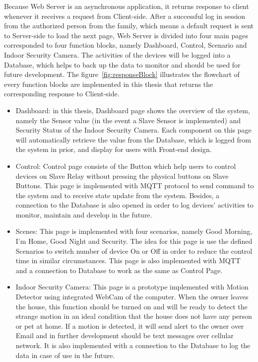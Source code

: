         Because Web Server is an asynchronous application, it returns response to client whenever it receives a request from Client-side. After a successful log in session from the authorized person from the family, which means a default request is sent to Server-side to load the next page, Web Server is divided into four main pages corresponded to four function blocks, namely Dashboard, Control, Scenario and Indoor Security Camera. The activities of the devices will be logged into a Database, which helps to back up the data to monitor and should be used for future development. The figure~\ref{fig:responseBlock} illustrates the flowchart of every function blocks are implemented in this thesis that returns the corresponding response to Client-side.
        \begin{itemize}
            \item Dashboard: in this thesis, Dashboard page shows the overview of the system, namely the Sensor value (in the event a Slave Sensor is implemented) and Security Status of the Indoor Security Camera. Each component on this page will automatically retrieve the value from the Database, which is logged from the system in prior, and display for users with Front-end design.
            \item Control: Control page consists of the Button which help users to control devices on Slave Relay without pressing the physical buttons on Slave Buttons. This page is implemented with MQTT protocol to send command to the system and to receive state update from the system. Besides, a connection to the Database is also opened in order to log devices’ activities to monitor, maintain and develop in the future.
            \item Scenes: This page is implemented with four scenarios, namely Good Morning, I’m Home, Good Night and Security. The idea for this page is use the defined Scenarios to switch number of device On or Off in order to reduce the control time in similar circumstances. This page is also implemented with MQTT and a connection to Database to work as the same as Control Page.
            \item Indoor Security Camera: This page is a prototype implemented with Motion Detector using integrated WebCam of the computer. When the owner leaves the house, this function should be turned on and will be ready to detect the strange motion in an ideal condition that the house does not have any person or pet at home. If a motion is detected, it will send alert to the owner over Email and in further development should be text messages over cellular network. It is also implemented with a connection to the Database to log the data in case of use in the future.
            \end{itemize}
            
